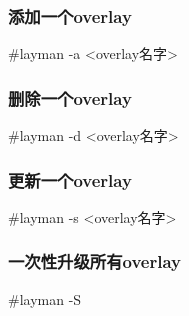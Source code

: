 \subsubsection*{添加一个overlay}

\begin{code}
\#layman -a <overlay名字>
\end{code}

\subsubsection*{删除一个overlay}

\begin{code}
\#layman -d <overlay名字>
\end{code}

\subsubsection*{更新一个overlay}

\begin{code}
\#layman -s <overlay名字>
\end{code}

\subsubsection*{一次性升级所有overlay}

\begin{code}
\#layman -S
\end{code}
